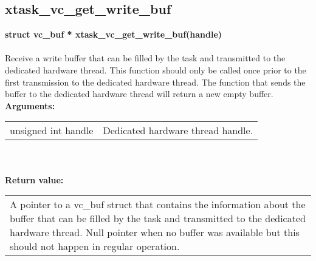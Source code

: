 \begin{samepage}
\subsection{xtask\_vc\_get\_write\_buf}
\noindent
\textbf{struct vc\_buf * xtask\_vc\_get\_write\_buf(handle)}\\\\
Receive a write buffer that can be filled by the task and
transmitted to the dedicated hardware thread. This function
should only be called once prior to the first transmission
to the dedicated hardware thread. The function that sends
the buffer to the dedicated hardware thread will return a
new empty buffer.\\

\noindent
\textbf{Arguments:}\\
\indent\begin{tabular}{ p{4.5cm}  p{9cm} }
unsigned int handle      & Dedicated hardware thread handle. \\           
\end{tabular}\\\\

\noindent
\textbf{Return value:}\\
\indent\begin{tabular}{  p{13.5cm} }
A pointer to a vc\_buf struct that contains the information
about the buffer that can be filled by the task and
transmitted to the dedicated hardware thread.
Null pointer when no buffer was available but this should
not happen in regular operation.
\end{tabular}
\end{samepage}

